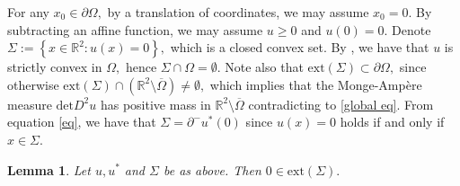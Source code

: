\documentclass[11pt]{amsart}
\theoremstyle{plain}
\newtheorem{lemma}{Lemma}[section]
\renewcommand{\det}{\mbox{det}}
\newcommand{\0}{\textbf{0}}
\numberwithin{equation}{section}
\numberwithin{equation}{section}
\numberwithin{figure}{section}
\begin{document}
	For any $x_0\in \partial \Omega,$ by a translation of coordinates, we may assume $x_0=0.$ By subtracting an affine function, we may assume $u\geq 0$ and $u(0)=0.$ Denote $\Sigma:=\left\{x\in \mathbb{R}^2: u(x)=0\right\},$ which is a closed convex set.
	By \cite{C92}, we have that $u$ is strictly convex in $\Omega,$ hence $\Sigma\cap \Omega=\emptyset.$
	Note also that $\text{ext} (\Sigma)\subset \partial \Omega,$ since otherwise 
	$\text{ext} (\Sigma)\cap(\mathbb{R}^2\setminus\overline{\Omega})\ne\emptyset,$
	which implies that the Monge-Amp\`ere measure $\det D^2u$ has positive mass in  
	$\mathbb{R}^2\setminus\overline{\Omega}$ contradicting to \eqref{global eq}.
	From equation \eqref{eq}, we have that $\Sigma=\partial^{-}u^*(0)$ since $u(x)=0$ holds if and only if $x\in \Sigma.$
	\begin{lemma}\label{extreme}
		Let $u,u^*$ and $\Sigma$ be as above. Then $0\in \text{ext}(\Sigma).$
	\end{lemma}
\end{document}
